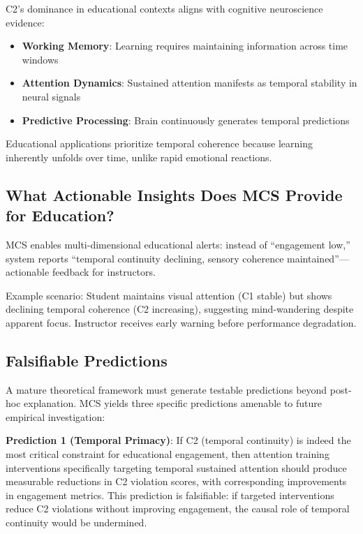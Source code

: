 \documentclass[10pt,journal,compsoc]{IEEEtran}
\begin{document}
C2's dominance in educational contexts aligns with cognitive neuroscience evidence:

\begin{itemize}
    \item \textbf{Working Memory}: Learning requires maintaining information across time windows~\cite{sweller2019}
    \item \textbf{Attention Dynamics}: Sustained attention manifests as temporal stability in neural signals~\cite{eeg-engagement}
    \item \textbf{Predictive Processing}: Brain continuously generates temporal predictions~\cite{friston2010}
\end{itemize}

Educational applications prioritize temporal coherence because learning inherently unfolds over time, unlike rapid emotional reactions.

\subsection{What Actionable Insights Does MCS Provide for Education?}

MCS enables multi-dimensional educational alerts: instead of ``engagement low,'' system reports ``temporal continuity declining, sensory coherence maintained''—actionable feedback for instructors.

Example scenario: Student maintains visual attention (C1 stable) but shows declining temporal coherence (C2 increasing), suggesting mind-wandering despite apparent focus. Instructor receives early warning before performance degradation.

\subsection{Falsifiable Predictions}

A mature theoretical framework must generate testable predictions beyond post-hoc explanation. MCS yields three specific predictions amenable to future empirical investigation:

\textbf{Prediction 1 (Temporal Primacy)}: If C2 (temporal continuity) is indeed the most critical constraint for educational engagement, then attention training interventions specifically targeting temporal sustained attention should produce measurable reductions in C2 violation scores, with corresponding improvements in engagement metrics. This prediction is falsifiable: if targeted interventions reduce C2 violations without improving engagement, the causal role of temporal continuity would be undermined.
\end{document}
